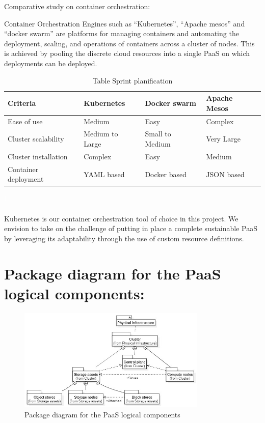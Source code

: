 \newpage
Comparative study on container orchestration: 

Container Orchestration Engines such as “Kubernetes”, “Apache mesos” and “docker swarm” are platforms for managing containers and automating the deployment, scaling, and operations of containers across a cluster of nodes. This is achieved by pooling the discrete cloud resources into a single PaaS on which deployments can be deployed. 

\begin{table}[h!]
\center
\begin{tabular}[b]{|m{3cm}|m{4cm}|m{4cm}|m{4cm}|}
\hline
Criteria & Kubernetes & Docker swarm & Apache Mesos  \\
\hline
Ease of use & Medium & Easy & Complex  \\
\hline
Cluster scalability & Medium to Large & Small to Medium & Very Large  \\
\hline
Cluster installation & Complex & Easy & Medium  \\
\hline
Container deployment & YAML based  & Docker based & JSON based 
\end{tabular}
\caption{Table Sprint planification}
\textcolor{white}{I} \label{tab:tab-m}
\end{table}

\paragraph{}Kubernetes is our container orchestration tool of choice in this project. We envision to take on the challenge of putting in place a complete sustainable PaaS by leveraging its adaptability through the use of custom resource definitions. 


\section{Package diagram for the PaaS logical components:}

\begin{figure}[!ht]\centering
\includegraphics[width=0.8\textwidth,angle=00]{assets/f11.jpg}
\caption{Package diagram for the PaaS logical components}
\label{fig:f11}
\end{figure}


